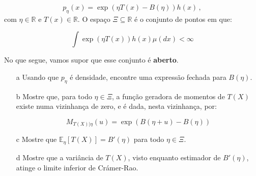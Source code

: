 \documentclass[10pt,a4paper]{article}
\begin{document}
 $$p_\eta(x) = \exp(\eta T(x) - B(\eta)) h(x)\, ,$$
 com $\eta \in \mathbb{R}$ e $T(x) \in \mathbb{R}$. O espaço $\Xi\subseteq \mathbb{R}$ é o conjunto de pontos em que: 
 
 $$\int \exp(\eta T(x)) h(x) \mu(dx) < \infty$$
 
 No que segue, vamos supor que esse conjunto é \textbf{aberto}.
 
 \begin{itemize}
 	\item[a]Usando que $p_\eta$ é densidade,  encontre uma expressão fechada para $B(\eta)$.
 	\item[b] Mostre que, para todo $\eta \in \Xi$, a função geradora de momentos de $T(X)$ existe numa vizinhança de zero, e é dada, nesta vizinhança, por:
 	
 	$$M_{T(X)|\eta}(u) =  \exp(B(\eta+u) - B(\eta))$$
 	
 	\item[c] Mostre que $\mathbb{E}_\eta[T(X)] = B'(\eta)$ para todo $\eta \in \Xi$.
 	\item[d] Mostre que a variância de $T(X)$, visto enquanto estimador de  $B'(\eta)$, atinge o limite inferior de Crámer-Rao.
 \end{itemize}
\end{document}
